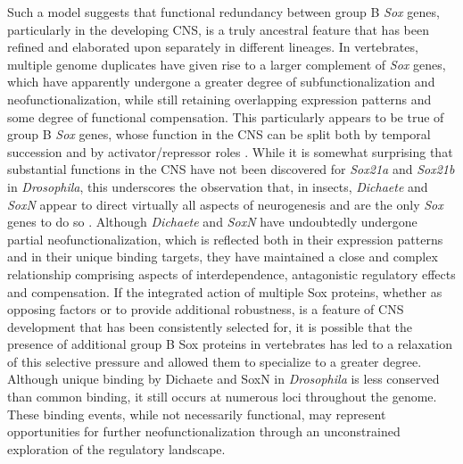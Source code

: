 Such a model suggests that functional redundancy between group B \emph{Sox} genes, particularly in the developing CNS, is a truly ancestral feature that has been refined and elaborated upon separately in different lineages. In vertebrates, multiple genome duplicates have given rise to a larger complement of \emph{Sox} genes, which have apparently undergone a greater degree of subfunctionalization and neofunctionalization, while still retaining overlapping expression patterns and some degree of functional compensation. This particularly appears to be true of group B \emph{Sox} genes, whose function in the CNS can be split both by temporal succession \citep{bergsland_sequentially_2011} and by activator/repressor roles \citep{uchikawa_two_1999}. While it is somewhat surprising that substantial functions in the CNS have not been discovered for \emph{Sox21a} and \emph{Sox21b} in \emph{Drosophila}, this underscores the observation that, in insects, \emph{Dichaete} and \emph{SoxN} appear to direct virtually all aspects of neurogenesis and are the only \emph{Sox} genes to do so \citep{ferrero_soxneuro_2014}. Although \emph{Dichaete} and \emph{SoxN} have undoubtedly undergone partial neofunctionalization, which is reflected both in their expression patterns and in their unique binding targets, they have maintained a close and complex relationship comprising aspects of interdependence, antagonistic regulatory effects and compensation. If the integrated action of multiple Sox proteins, whether as opposing factors or to provide additional robustness, is a feature of CNS development that has been consistently selected for, it is possible that the presence of additional group B Sox proteins in vertebrates has led to a relaxation of this selective pressure and allowed them to specialize to a greater degree. Although unique binding by Dichaete and SoxN in \emph{Drosophila} is less conserved than common binding, it still occurs at numerous loci throughout the genome. These binding events, while not necessarily functional, may represent opportunities for further neofunctionalization through an unconstrained exploration of the regulatory landscape.

